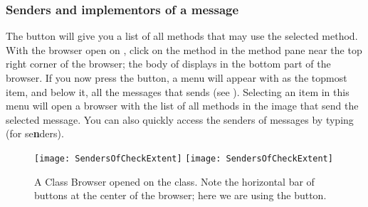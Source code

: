 \documentclass[a4paper,10pt,twoside]{book}
\begin{document}

\subsubsection{Senders and implementors of a message}
\label{sec:sendersImplementors}

The  button will give you a list of all methods that may use the selected method.
With the browser open on , click on the  method in the method pane near the top right corner of the browser; the body of  displays in the bottom part of the browser.
If you now press the  button, a menu will appear with  as the topmost item, and below it, all the messages that  sends (see ).
Selecting an item in this menu will open a browser with the list of all methods in the image that send the selected message.
You can also quickly access the senders of messages by typing  (for {se\textbf{n}ders}).

\begin{figure}[htbp]
	\begin{center}
   \ifluluelse
		{\texttt{[image: SendersOfCheckExtent]}}
		{\texttt{[image: SendersOfCheckExtent]}}
	\end{center}
	\caption{A Class Browser opened on the  class. Note the horizontal bar of buttons at the center of the browser; here we are using the  button.}
	\label{fig:SendersOfCheckExtent}
\end{figure}
\end{document}

